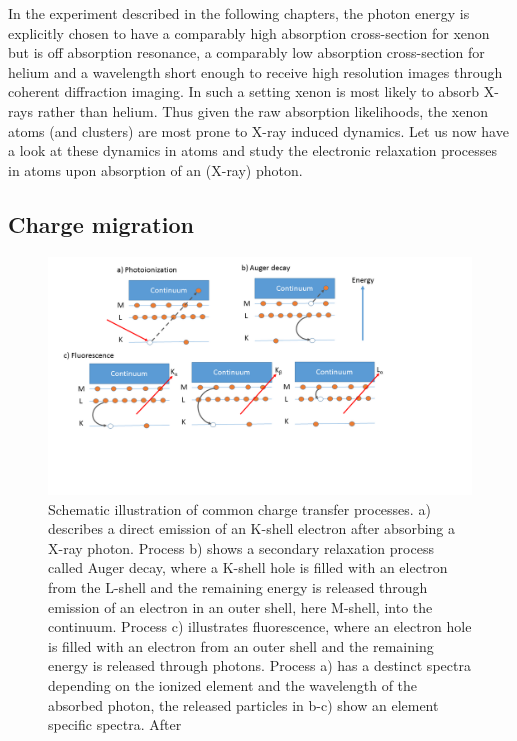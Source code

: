In the experiment described in the following chapters, the photon energy is explicitly chosen to have a comparably high absorption cross-section for xenon but is off absorption resonance, a comparably low absorption cross-section for helium and a wavelength short enough to receive high resolution images through coherent diffraction imaging. In such a setting xenon is most likely to absorb X-rays rather than helium. Thus given the raw absorption likelihoods, the xenon atoms (and clusters) are most prone to X-ray induced dynamics. Let us now have a look at these dynamics in atoms and study the electronic relaxation processes in atoms upon absorption of an (X-ray) photon.
%
%
%
%
%
\subsection{Charge migration}\label{sec:relaxation}
\begin{figure}
	\centering
		\includegraphics[width=1.00\textwidth]{images/el-relaxation.png}
	\caption[Schematic illustration of common charge transfer processes]{Schematic illustration of common charge transfer processes. a) describes a direct emission of an K-shell electron after absorbing a X-ray photon. Process b) shows a secondary relaxation process called Auger decay, where a K-shell hole is filled with an electron from the L-shell and the remaining energy is released through emission of an electron in an outer shell, here M-shell, into the continuum. Process c) illustrates fluorescence, where an electron hole is filled with an electron from an outer shell and the remaining energy is released through photons. Process a) has a destinct spectra depending on the ionized element and the wavelength of the absorbed photon, the released particles in b-c) show an element specific spectra. After \citep[][p.~19]{Als-Nielson-2011-JWS}}
	\label{fig:el-relaxation}
\end{figure}
